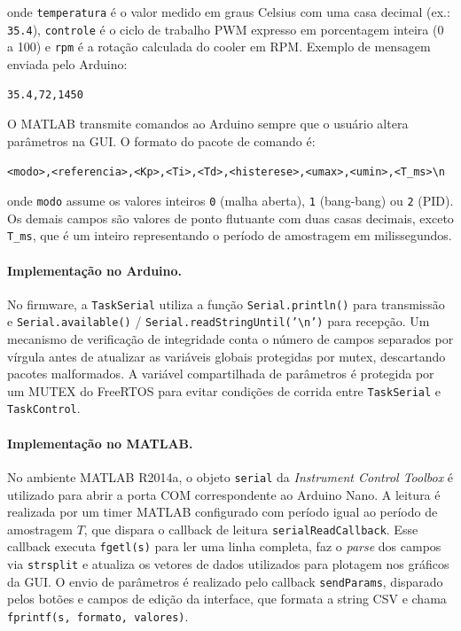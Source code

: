 \documentclass[repeatfields,xlists,xpacks,oneside]{ufrgscca}
\begin{document}
onde \texttt{temperatura} é o valor medido em graus Celsius
com uma casa decimal (ex.: \texttt{35.4}), \texttt{controle}
é o ciclo de trabalho PWM expresso em porcentagem inteira
(0 a 100) e \texttt{rpm} é a rotação calculada do cooler em
RPM\@. Exemplo de mensagem enviada pelo Arduino:

\begin{lstlisting}[caption={Exemplo de mensagem CSV enviada pelo Arduino.},
                   label={lst:csv_arduino}]
35.4,72,1450
\end{lstlisting}

O MATLAB transmite comandos ao Arduino sempre que o usuário
altera parâmetros na GUI\@. O formato do pacote de comando é:

\begin{center}
\texttt{<modo>,<referencia>,<Kp>,<Ti>,<Td>,<histerese>,<umax>,<umin>,<T\_ms>\textbackslash n}
\end{center}

onde \texttt{modo} assume os valores inteiros \texttt{0}
(malha aberta), \texttt{1} (bang-bang) ou \texttt{2} (PID).
Os demais campos são valores de ponto flutuante com duas
casas decimais, exceto \texttt{T\_ms}, que é um inteiro
representando o período de amostragem em milissegundos.

\paragraph{Implementação no Arduino.}
No firmware, a \texttt{TaskSerial} utiliza a função
\texttt{Serial.println()} para transmissão e
\texttt{Serial.available()} / \texttt{Serial.readStringUntil('\textbackslash n')}
para recepção. Um mecanismo de verificação de integridade
conta o número de campos separados por vírgula antes de
atualizar as variáveis globais protegidas por mutex,
descartando pacotes malformados. A variável compartilhada
de parâmetros é protegida por um MUTEX do FreeRTOS para
evitar condições de corrida entre \texttt{TaskSerial} e
\texttt{TaskControl}.

\paragraph{Implementação no MATLAB.}
No ambiente MATLAB R2014a, o objeto \texttt{serial} da
\textit{Instrument Control Toolbox} é utilizado para abrir
a porta COM correspondente ao Arduino Nano. A leitura é
realizada por um timer MATLAB configurado com período igual
ao período de amostragem $T$, que dispara o callback de
leitura \texttt{serialReadCallback}. Esse callback executa
\texttt{fgetl(s)} para ler uma linha completa, faz o
\textit{parse} dos campos via \texttt{strsplit} e atualiza
os vetores de dados utilizados para plotagem nos gráficos da
GUI\@. O envio de parâmetros é realizado pelo callback
\texttt{sendParams}, disparado pelos botões e campos de
edição da interface, que formata a string CSV e chama
\texttt{fprintf(s, formato, valores)}.
\end{document}
